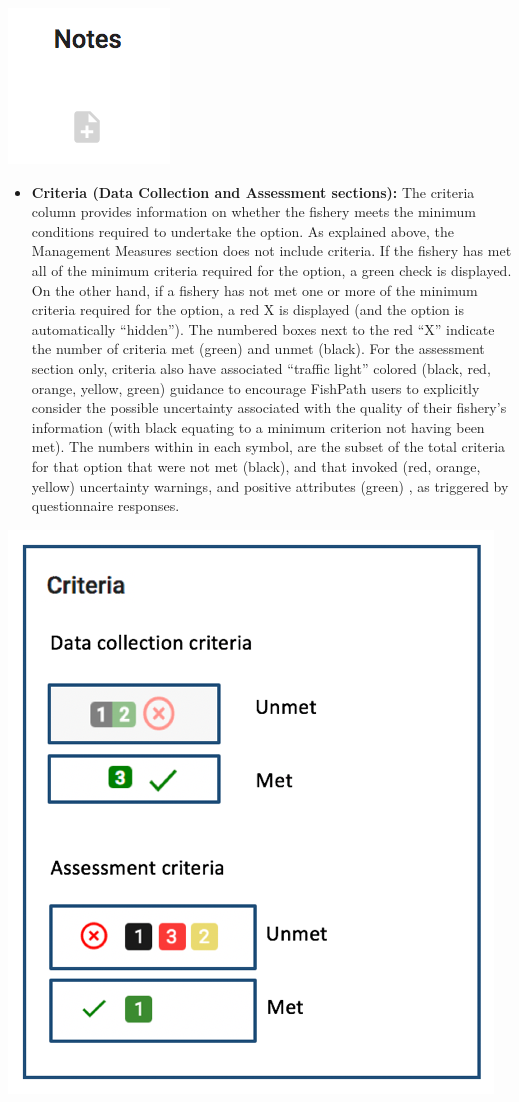 \documentclass[11pt,]{book}
\providecommand{\tightlist}{%
  \setlength{\itemsep}{0pt}\setlength{\parskip}{0pt}}
\begin{document}
\begin{center}\includegraphics[width=0.15\linewidth]{images/notes} \end{center}

\begin{itemize}
\tightlist
\item
  \textbf{Criteria (Data Collection and Assessment sections):} The criteria column provides information on whether the fishery meets the minimum conditions required to undertake the option. As explained above, the Management Measures section does not include criteria. If the fishery has met all of the minimum criteria required for the option, a green check is displayed. On the other hand, if a fishery has not met one or more of the minimum criteria required for the option, a red X is displayed (and the option is automatically ``hidden''). The numbered boxes next to the red ``X'' indicate the number of criteria met (green) and unmet (black). For the assessment section only, criteria also have associated ``traffic light'' colored (black, red, orange, yellow, green) guidance to encourage FishPath users to explicitly consider the possible uncertainty associated with the quality of their fishery's information (with black equating to a minimum criterion not having been met). The numbers within in each symbol, are the subset of the total criteria for that option that were not met (black), and that invoked (red, orange, yellow) uncertainty warnings, and positive attributes (green) , as triggered by questionnaire responses.
\end{itemize}

\begin{center}\includegraphics[width=0.35\linewidth]{images/criteria} \end{center}
\end{document}
